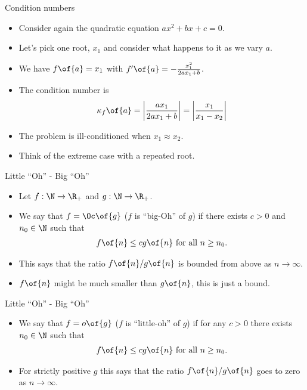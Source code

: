 \documentclass[11pt,xcolor={dvipsnames},aspectratio=159,hyperref={pdftex,pdfpagemode=UseNone,hidelinks,pdfdisplaydoctitle=true},usepdftitle=false]{beamer}
\begin{document}
\begin{frame}{Condition numbers}
    \begin{itemize}
     \item Consider again the quadratic equation $ax^2 +bx + c = 0$. 
     \item Let's pick one root, $x_1$ and consider what happens to it as we vary $a$. 
     \item We have $f\of{a} = x_1$ with $f^\prime\of{a} = - \frac{x^2_1}{2 a x_1 + b}$.
     \item The condition number is \begin{align*}
         \kappa_f\of{a} = \bigg| \frac{a x_1}{2 a x_1 + b} \bigg| = \bigg| \frac{x_1}{x_1-x_2}\bigg|\end{align*}

    \item The problem is ill-conditioned when $x_1 \approx x_2$.
    \item Think of the extreme case with a repeated root. 
    \end{itemize}
\end{frame}

\begin{frame}{Little ``Oh'' - Big ``Oh''}
    \begin{itemize}
     \item Let $f:\N\rightarrow\R_{+}$ and $g:\N\rightarrow\R_{+}$. 
     \item We say that $f=\Oc\of{g}$ ($f$ is ``big-Oh'' of $g$) 
    if there exists $c>0$ and $n_0 \in \N$ such that \begin{align*} 
    f\of{n} \leq c g\of{n} \text{ for all } n\geq n_0.
     \end{align*}
     \item This says that the ratio $f\of{n} \slash g\of{n}$ is bounded from above as $n \to \infty$.
     \item $f\of{n}$ might be much smaller than $g\of{n}$, this is just a bound. 
    \end{itemize}
\end{frame}

\begin{frame}{Little ``Oh'' - Big ``Oh''}
    \begin{itemize}
     \item We say that $f=o\of{g}$ ($f$ is ``little-oh'' of $g$) 
    if for any $c>0$ there exists $n_0 \in \N$ such that \begin{align*} 
    f\of{n} \leq c g\of{n} \text{ for all } n\geq n_0.
    \end{align*}
     \item For strictly positive $g$ this says that the ratio $f\of{n} \slash g\of{n}$ goes to zero as $n \to \infty$.
    \end{itemize}
\end{frame}
\end{document}
